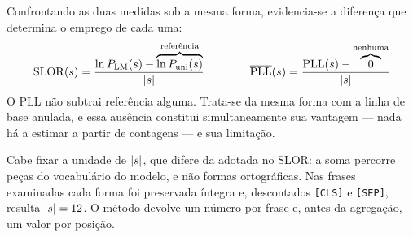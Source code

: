 Confrontando as duas medidas sob a mesma forma, evidencia-se a diferença que determina o
emprego de cada uma:
%
\begin{equation}
\mathrm{SLOR}(s) = \frac{\ln P_{\mathrm{LM}}(s) - \overbrace{\ln P_{\mathrm{uni}}(s)}^{\text{referência}}}{|s|}
\qquad\qquad
\overline{\mathrm{PLL}}(s) = \frac{\mathrm{PLL}(s) - \overbrace{0}^{\text{nenhuma}}}{|s|}
\label{eq:pll-vs-slor}
\end{equation}
%
O PLL não subtrai referência alguma. Trata-se da mesma forma com a linha de base anulada, e
essa ausência constitui simultaneamente sua vantagem --- nada há a estimar a partir de
contagens --- e sua limitação.

Cabe fixar a unidade de $|s|$, que difere da adotada no SLOR: a soma percorre peças do
vocabulário do modelo, e não formas ortográficas. Nas frases examinadas cada forma foi
preservada íntegra e, descontados \texttt{[CLS]} e \texttt{[SEP]}, resulta $|s| = 12$. O
método devolve um número por frase e, antes da agregação, um valor por posição.
